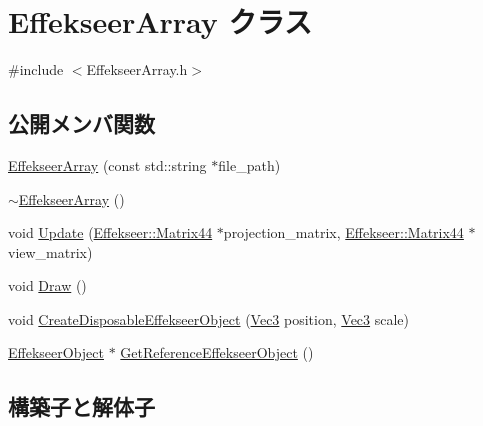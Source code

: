 \hypertarget{class_effekseer_array}{}\section{Effekseer\+Array クラス}
\label{class_effekseer_array}


{\ttfamily \#include $<$Effekseer\+Array.\+h$>$}

\subsection*{公開メンバ関数}
\begin{DoxyCompactItemize}
\item 
\mbox{\hyperlink{class_effekseer_array_ae598c1486d263356b63ba8d08a3afc20}{Effekseer\+Array}} (const std\+::string $\ast$file\+\_\+path)
\item 
\mbox{\hyperlink{class_effekseer_array_af5e7c360c77737f0c46b3a9dad2725ac}{$\sim$\+Effekseer\+Array}} ()
\item 
void \mbox{\hyperlink{class_effekseer_array_a41fcca7eb106c1c83851eca1284800f4}{Update}} (\mbox{\hyperlink{struct_effekseer_1_1_matrix44}{Effekseer\+::\+Matrix44}} $\ast$projection\+\_\+matrix, \mbox{\hyperlink{struct_effekseer_1_1_matrix44}{Effekseer\+::\+Matrix44}} $\ast$view\+\_\+matrix)
\item 
void \mbox{\hyperlink{class_effekseer_array_af915edc4a955bfc7927721a71016524d}{Draw}} ()
\item 
void \mbox{\hyperlink{class_effekseer_array_a8c86aa79851ef86f253c13765f708383}{Create\+Disposable\+Effekseer\+Object}} (\mbox{\hyperlink{_vector3_d_8h_ab16f59e4393f29a01ec8b9bbbabbe65d}{Vec3}} position, \mbox{\hyperlink{_vector3_d_8h_ab16f59e4393f29a01ec8b9bbbabbe65d}{Vec3}} scale)
\item 
\mbox{\hyperlink{class_effekseer_object}{Effekseer\+Object}} $\ast$ \mbox{\hyperlink{class_effekseer_array_a0bbf7d610ef2219e3699d3f26182af03}{Get\+Reference\+Effekseer\+Object}} ()
\end{DoxyCompactItemize}


\subsection{構築子と解体子}
\mbox{\label{class_effekseer_array_ae598c1486d263356b63ba8d08a3afc20}} 

